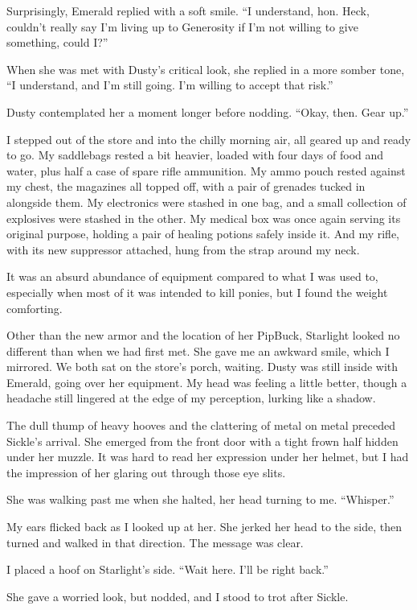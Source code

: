 Surprisingly, Emerald replied with a soft smile. “I understand, hon. Heck, couldn’t really say I’m living up to Generosity if I’m not willing to give something, could I?”

When she was met with Dusty’s critical look, she replied in a more somber tone, “I understand, and I’m still going. I’m willing to accept that risk.”

Dusty contemplated her a moment longer before nodding. “Okay, then. Gear up.”

{\br}%
I stepped out of the store and into the chilly morning air, all geared up and ready to go. My saddlebags rested a bit heavier, loaded with four days of food and water, plus half a case of spare rifle ammunition. My ammo pouch rested against my chest, the magazines all topped off, with a pair of grenades tucked in alongside them. My electronics were stashed in one bag, and a small collection of explosives were stashed in the other. My medical box was once again serving its original purpose, holding a pair of healing potions safely inside it. And my rifle, with its new suppressor attached, hung from the strap around my neck.

It was an absurd abundance of equipment compared to what I was used to, especially when most of it was intended to kill ponies, but I found the weight comforting.

Other than the new armor and the location of her PipBuck, Starlight looked no different than when we had first met. She gave me an awkward smile, which I mirrored. We both sat on the store’s porch, waiting. Dusty was still inside with Emerald, going over her equipment. My head was feeling a little better, though a headache still lingered at the edge of my perception, lurking like a shadow.

The dull thump of heavy hooves and the clattering of metal on metal preceded Sickle’s arrival. She emerged from the front door with a tight frown half hidden under her muzzle. It was hard to read her expression under her helmet, but I had the impression of her glaring out through those eye slits.

She was walking past me when she halted, her head turning to me. “Whisper.”

My ears flicked back as I looked up at her. She jerked her head to the side, then turned and walked in that direction. The message was clear.

I placed a hoof on Starlight’s side. “Wait here. I’ll be right back.”

She gave a worried look, but nodded, and I stood to trot after Sickle.

